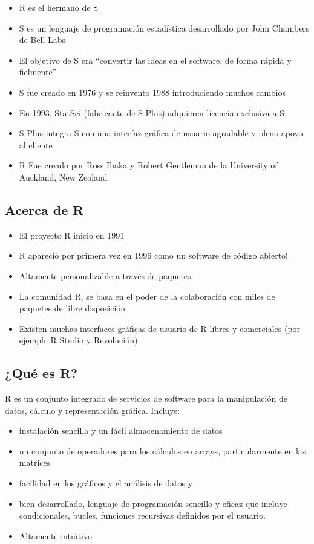 \documentclass[
]{book}
\providecommand{\tightlist}{%
  \setlength{\itemsep}{0pt}\setlength{\parskip}{0pt}}
\begin{document}
\begin{itemize}
\tightlist
\item
  R es el hermano de S
\item
  S es un lenguaje de programación estadística desarrollado por John Chambers de Bell Labs
\item
  El objetivo de S era ``convertir las ideas en el software, de forma rápida y fielmente''
\item
  S fue creado en 1976 y se reinvento 1988 introduciendo muchos cambios
\item
  En 1993, StatSci (fabricante de S-Plus) adquieren licencia exclusiva a S
\item
  S-Plus integra S con una interfaz gráfica de usuario agradable y pleno apoyo al cliente
\item
  R Fue creado por Ross Ihaka y Robert Gentleman de la University of Auckland, New Zealand
\end{itemize}

\hypertarget{acerca-de-r}{%
\subsection{Acerca de R}\label{acerca-de-r}}

\begin{itemize}
\tightlist
\item
  El proyecto R inicio en 1991
\item
  R apareció por primera vez en 1996 como un software de código abierto!
\item
  Altamente personalizable a través de paquetes
\item
  La comunidad R, se basa en el poder de la colaboración con miles de paquetes de libre disposición
\item
  Existen muchas interfaces gráficas de usuario de R libres y comerciales (por ejemplo R Studio y Revolución)
\end{itemize}

\hypertarget{quuxe9-es-r-1}{%
\subsection{¿Qué es R?}\label{quuxe9-es-r-1}}

R es un conjunto integrado de servicios de software para la manipulación de datos, cálculo y representación gráfica. Incluye:

\begin{itemize}
\tightlist
\item
  instalación sencilla y un fácil almacenamiento de datos
\item
  un conjunto de operadores para los cálculos en arrays, particularmente en las matrices
\item
  facilidad en los gráficos y el análisis de datos y
\item
  bien desarrollado, lenguaje de programación sencillo y eficaz que incluye condicionales, bucles, funciones recursivas definidos por el usuario.
\item
  Altamente intuitivo
\end{itemize}
\end{document}

